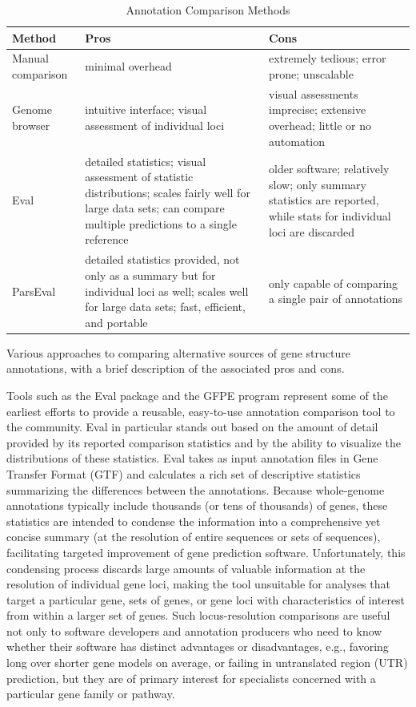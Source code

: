 \begin{table}
\scriptsize
\caption{Annotation Comparison Methods}
\label{Table:AnnotationComparisonMethods}
\begin{tabularx}{\textwidth}{lp{6cm}p{6cm}}
\hline
Method                & Pros        & Cons         \\ \hline
Manual comparison     & minimal overhead        & extremely tedious; error prone; unscalable             \\
Genome browser        & intuitive interface; visual assessment of individual loci        &  visual assessments imprecise; extensive overhead; little or no automation            \\
Eval                  & detailed statistics; visual assessment of statistic distributions; scales fairly well for large data sets; can compare multiple predictions to a single reference        & older software; relatively slow; only summary statistics are reported, while stats for individual loci are discarded             \\
ParsEval              & detailed statistics provided, not only as a summary but for individual loci as well; scales well for large data sets; fast, efficient, and portable        &  only capable of comparing a single pair of annotations            \\ \hline
\end{tabularx}
\label{Table:AnnotCompareMethods}
\raggedright
{\scriptsize
Various approaches to comparing alternative sources of gene structure annotations, with a brief description of the associated pros and cons.
}
\end{table}

Tools such as the Eval package \citep{Keibler} and the GFPE program \citep{Wang} represent some of the earliest efforts to provide a reusable, easy-to-use annotation comparison tool to the community.
Eval in particular stands out based on the amount of detail provided by its reported comparison statistics and by the ability to visualize the distributions of these statistics.
Eval takes as input annotation files in Gene Transfer Format (GTF) and calculates a rich set of descriptive statistics summarizing the differences between the annotations.
Because whole-genome annotations typically include thousands (or tens of thousands) of genes, these statistics are intended to condense the information into a comprehensive yet concise summary (at the resolution of entire sequences or sets of sequences), facilitating targeted improvement of gene prediction software.
Unfortunately, this condensing process discards large amounts of valuable information at the resolution of individual gene loci, making the tool unsuitable for analyses that target a particular gene, sets of genes, or gene loci with characteristics of interest from within a larger set of genes.
Such locus-resolution comparisons are useful not only to software developers and annotation producers who need to know whether their software has distinct advantages or disadvantages, e.g., favoring long over shorter gene models on average, or failing in untranslated region (UTR) prediction, but they are of primary interest for specialists concerned with a particular gene family or pathway.


